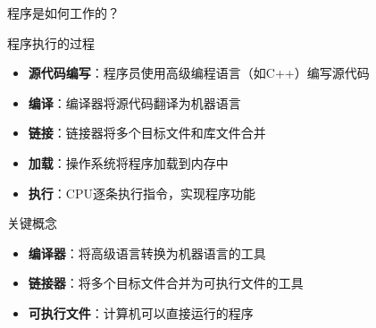 \documentclass[UTF8,aspectratio=169]{beamer}
\begin{document}
\begin{frame}{程序是如何工作的？}
    \begin{ytublock}{程序执行的过程}
        \begin{itemize}
            \item \textbf{源代码编写}：程序员使用高级编程语言（如C++）编写源代码
            \item \textbf{编译}：编译器将源代码翻译为机器语言
            \item \textbf{链接}：链接器将多个目标文件和库文件合并
            \item \textbf{加载}：操作系统将程序加载到内存中
            \item \textbf{执行}：CPU逐条执行指令，实现程序功能
        \end{itemize}
    \end{ytublock}

    \begin{ytublock}{关键概念}
        \begin{itemize}
            \item \textbf{编译器}：将高级语言转换为机器语言的工具
            \item \textbf{链接器}：将多个目标文件合并为可执行文件的工具
            \item \textbf{可执行文件}：计算机可以直接运行的程序
        \end{itemize}
    \end{ytublock}
\end{frame}
\end{document}
